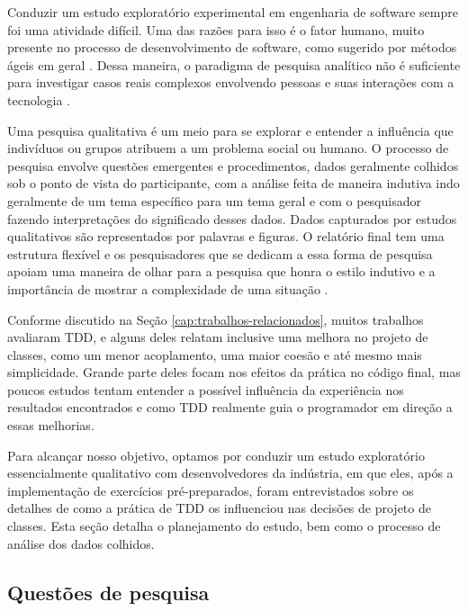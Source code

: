 \documentclass[conference]{IEEEtran}
\begin{document}
Conduzir um estudo exploratório experimental em engenharia de software sempre foi uma
atividade difícil. Uma das razões para isso é o fator humano, muito presente 
no processo de desenvolvimento de software, como sugerido por métodos ágeis  em
geral \cite{AgileManifesto}. Dessa maneira, o paradigma de pesquisa analítico 
não é suficiente para investigar casos reais complexos envolvendo pessoas e 
suas interações com a tecnologia \cite{guidelines-case-study}.

Uma pesquisa qualitativa é um meio para se explorar e entender a influência que 
indivíduos ou grupos atribuem a um problema social ou humano. O processo de
pesquisa envolve questões emergentes e procedimentos, dados geralmente colhidos
sob o ponto de vista do participante, com a análise feita de maneira indutiva
indo geralmente de um tema específico para um tema geral e com o pesquisador
fazendo interpretações do significado desses dados. Dados capturados por estudos
qualitativos são representados por palavras e figuras.
O relatório final tem uma estrutura flexível e os pesquisadores que se
dedicam a essa forma de pesquisa apoiam uma maneira de olhar para a pesquisa que
honra o estilo indutivo e a importância de mostrar a 
complexidade de uma situação \cite{creswell}.

Conforme discutido na Seção \ref{cap:trabalhos-relacionados}, muitos 
trabalhos avaliaram TDD, e alguns deles relatam inclusive uma melhora
no projeto de classes, como um menor acoplamento, uma maior coesão e até mesmo
mais simplicidade. 
Grande parte deles focam nos efeitos da prática no código final, mas poucos 
estudos tentam entender a possível influência da experiência
nos resultados encontrados e como TDD realmente guia o programador 
em direção a essas melhorias.

Para alcançar nosso objetivo, optamos por conduzir um estudo 
exploratório essencialmente qualitativo
com desenvolvedores da indústria, em que eles, após a implementação
de exercícios pré-preparados, foram entrevistados sobre os
detalhes de como a prática de TDD os influenciou nas 
decisões de projeto de classes.
Esta seção detalha o planejamento do estudo, 
bem como o processo de análise dos dados colhidos.

\subsection{Questões de pesquisa}
\end{document}
